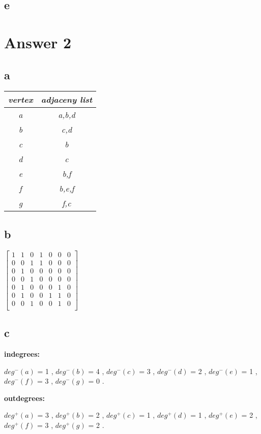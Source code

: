 \documentclass[11pt]{article}
\begin{document}
\subsection*{e}

\section*{Answer 2}
\subsection*{a}
	\bigskip
	\begin{tabular}{|c|c|} \hline
	\textit{vertex} & \textit{adjaceny list} \\ \hline
	\textit{a} & \textit{a,b,d} \\
	\textit{b} & \textit{c,d} \\
	\textit{c} & \textit{b} \\
	\textit{d} & \textit{c} \\
	\textit{e} & \textit{b,f} \\
	\textit{f} & \textit{b,e,f} \\
	\textit{g} & \textit{f,c} \\ \hline
	\end{tabular}
	
\subsection*{b}
\bigskip
$\begin{bmatrix}


1 & 1 & 0 & 1 & 0 & 0 & 0 \\
0 & 0 & 1 & 1 & 0 & 0 & 0 \\
0 & 1 & 0 & 0 & 0 & 0 & 0 \\
0 & 0 & 1 & 0 & 0 & 0 & 0 \\
0 & 1 & 0 & 0 & 0 & 1 & 0 \\
0 & 1 & 0 & 0 & 1 & 1 & 0 \\
0 & 0 & 1 & 0 & 0 & 1 & 0 \\

\end{bmatrix}$
\subsection*{c}
\hspace{15px} \textbf{indegrees:}  \par 
\textit{$deg^{-}(a)$} = 1 , 
\textit{$deg^{-}(b)$} = 4 ,
\textit{$deg^{-}(c)$} = 3 ,
\textit{$deg^{-}(d)$} = 2 ,
\textit{$deg^{-}(e)$} = 1 ,
\textit{$deg^{-}(f)$} = 3 ,
\textit{$deg^{-}(g)$} = 0 .
\par 
\textbf{outdegrees:} \par 
\textit{$deg^{+}(a)$} = 3 ,
\textit{$deg^{+}(b)$} = 2 ,
\textit{$deg^{+}(c)$} = 1 ,
\textit{$deg^{+}(d)$} = 1 ,
\textit{$deg^{+}(e)$} = 2 ,
\textit{$deg^{+}(f)$} = 3 ,
\textit{$deg^{+}(g)$} = 2 .
\end{document}
